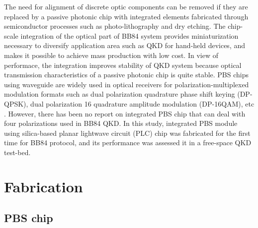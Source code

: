 \documentclass[letterpaper, 10pt]{article}
\begin{document}
The need for alignment of discrete optic components can be removed if they are replaced by  a passive photonic chip with integrated elements
fabricated through semiconductor processes such as photo-lithography and dry etching.
The chip-scale integration of the optical part of BB84 system provides miniaturization necessary to diversify application area such as QKD for hand-held devices, and makes it possible to achieve mass production with low cost.
In view of performace, the integration improves stability of QKD system because optical transmission characteristics of a passive photonic chip is quite stable.
PBS chips using waveguide are widely used in optical receivers for polarization-multiplexed modulation formats such as dual polarization quadrature phase shift keying (DP-QPSK), dual polarization 16 quadrature amplitude modulation (DP-16QAM), etc  \cite{Lee:2016bg,PoDong:2014kj}.
However, there has been no report on integrated PBS chip that can deal with four polarizations used in BB84 QKD.
In this study, integrated PBS module using  silica-based planar lightwave circuit (PLC) chip was fabricated for the first time for BB84 protocol, and its performance was assessed it in a free-space QKD test-bed.

\section{Fabrication}
\subsection{PBS chip}
\end{document}
